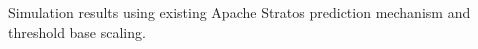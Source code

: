 \label{stratos} Simulation results using existing Apache Stratos prediction mechanism and threshold base scaling.